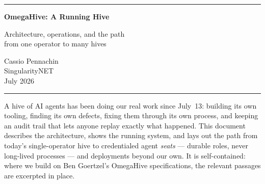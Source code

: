 \documentclass[11pt]{article}
\begin{document}
\begin{titlepage}
\thispagestyle{empty}
\vspace*{1.6cm}
{\color{honey}\rule{\textwidth}{2.5pt}}\par
\vspace{1.1cm}
{\Huge\bfseries\color{slate} OmegaHive: A Running Hive\par}
\vspace{0.55cm}
{\LARGE\color{inkgrey} Architecture, operations, and the path\\[2pt] from one operator to many hives\par}
\vspace{1.6cm}
{\large Cassio Pennachin \\[3pt] \color{inkgrey} SingularityNET \\[14pt] July 2026\par}
\vspace{1.2cm}
{\color{honey}\rule{\textwidth}{1pt}}\par
\vspace{0.9cm}
\begin{minipage}{0.92\textwidth}
\normalsize
A hive of AI agents has been doing our real work since July~13: building its own tooling, finding its own defects, fixing them through its own process, and keeping an audit trail that lets anyone replay exactly what happened. This document describes the architecture, shows the running system, and lays out the path from today's single-operator hive to credentialed agent \emph{seats} --- durable roles, never long-lived processes --- and deployments beyond our own. It is self-contained: where we build on Ben Goertzel's OmegaHive specifications, the relevant passages are excerpted in place.
\end{minipage}
\vfill
\end{titlepage}

{\hypersetup{hidelinks}\setcounter{tocdepth}{1}\tableofcontents}
\clearpage

\end{document}
